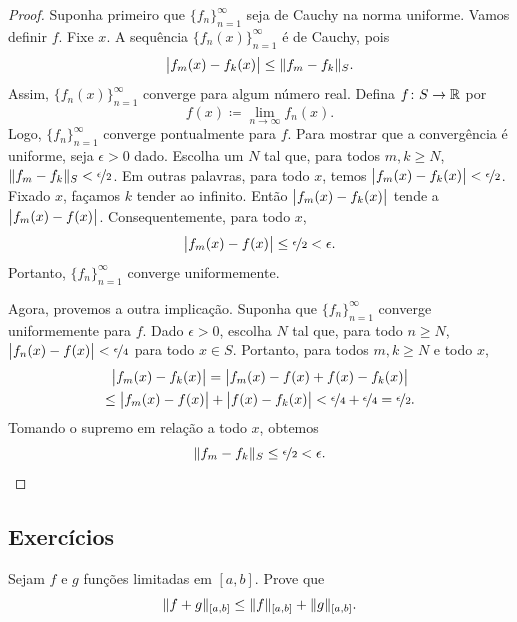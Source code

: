 \begin{proof}
Suponha primeiro que $\{ f_n \}_{n=1}^\infty$ seja de Cauchy na norma
uniforme. Vamos definir $f$. Fixe $x$.
A sequência $\bigl\{ f_n(x) \bigr\}_{n=1}^\infty$ é de Cauchy, pois
\begin{equation*}
\bigl\lvert {f_m(x)-f_k(x)} \bigr\rvert
\leq
\lVert {f_m-f_k} \rVert_S .
\end{equation*}
Assim, $\bigl\{ f_n(x) \bigr\}_{n=1}^\infty$ converge para algum número real. Defina $f \colon S
\to {\mathbb{R}}$ por
\begin{equation*}
f(x) \coloneqq \lim_{n \to \infty} f_n(x) .
\end{equation*}
Logo, $\{ f_n \}_{n=1}^\infty$ converge pontualmente para $f$. Para
mostrar que a convergência é uniforme, seja $\epsilon > 0$ dado. Escolha
um $N$ tal que, para todos $m,k \geq N$,
$\lVert {f_m-f_k} \rVert_S < \nicefrac{\epsilon}{2}$. Em outras palavras, para
todo $x$, temos $\bigl\lvert {f_m(x)-f_k(x)} \bigr\rvert < \nicefrac{\epsilon}{2}$.
Fixado $x$, façamos $k$ tender ao infinito. Então
$\bigl\lvert {f_m(x)-f_k(x)} \bigr\rvert$ tende a $\bigl\lvert {f_m(x)-f(x)} \bigr\rvert$.
Consequentemente, para todo $x$,
\begin{equation*}
\bigl\lvert {f_m(x)-f(x)} \bigr\rvert \leq \nicefrac{\epsilon}{2} < \epsilon .
\end{equation*}
Portanto, $\{ f_n \}_{n=1}^\infty$ converge uniformemente.

Agora, provemos a outra implicação.
Suponha que $\{ f_n \}_{n=1}^\infty$ converge uniformemente para $f$.
Dado $\epsilon > 0$, escolha $N$ tal que, para todo $n \geq N$,
$\bigl\lvert {f_n(x)-f(x)} \bigr\rvert < \nicefrac{\epsilon}{4}$ para todo $x \in S$.
Portanto, para todos $m,k \geq N$ e todo $x$,
\begin{multline*}
\bigl\lvert {f_m(x)-f_k(x)} \bigr\rvert = 
\bigl\lvert {f_m(x)-f(x)+f(x)-f_k(x)} \bigr\rvert
\\
\leq
\bigl\lvert {f_m(x)-f(x)} \bigr\rvert+\bigl\lvert {f(x)-f_k(x)} \bigr\rvert < \nicefrac{\epsilon}{4} +
\nicefrac{\epsilon}{4} = \nicefrac{\epsilon}{2} .
\end{multline*}
Tomando o supremo em relação a todo $x$, obtemos
\begin{equation*}
\lVert {f_m-f_k} \rVert_S \leq \nicefrac{\epsilon}{2} < \epsilon .  \qedhere
\end{equation*}
\end{proof}

\subsection{Exercícios}

\begin{exercise}
Sejam $f$ e $g$ funções limitadas em $[a,b]$. Prove que
\begin{equation*}
\lVert {f+g} \rVert_{[a,b]} \leq \lVert {f} \rVert_{[a,b]} + \lVert {g} \rVert_{[a,b]} .
\end{equation*}
\end{exercise}

